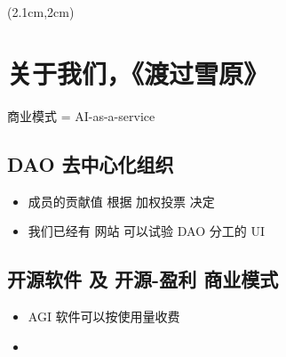 \begin{preview}
\begin{minipage}{\textwidth}
\setlength{\parskip}{0.4\baselineskip}

\begin{textblock*}{20cm}(2.1cm,2cm) %
	{}
\end{textblock*}
\vspace*{0.3cm} 

\section{关于我们，《渡过雪原》}

商业模式 = AI-as-a-service

\subsection{DAO 去中心化组织}

\begin{itemize}
	\item 成员的贡献值 根据 加权投票 决定
	
	\item 我们已经有 网站 可以试验 DAO 分工的 UI

\end{itemize}

\subsection{开源软件 及 开源-盈利 商业模式}

\begin{itemize}
	\item AGI 软件可以按使用量收费 
	
	\item 
	
\end{itemize}


\end{minipage}
\end{preview}


